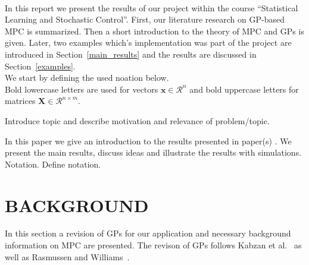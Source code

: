 \documentclass[letterpaper, 10 pt, conference]{ieeeconf}  %
\begin{document}
 \\
In this report we present the results of our project within the course ``Statistical Learning and Stochastic Control''. First, our literature research on GP-based MPC is summarized. Then a short introduction to the theory of MPC and GPs is given. Later, two examples which's  implementation was part of the project are introduced in Section~\ref{main_results} and the results are discussed in Section~\ref{examples}.\\
We start by defining the used noation below.\\
Bold lowercase letters are used for vectors $\boldsymbol{x} \in \mathcal{R}^n$ and bold uppercase letters for matrices $\boldsymbol{X} \in \mathcal{R}^{n \times m}$.

Introduce topic and describe motivation and relevance of problem/topic.

In this paper we give an introduction to the results presented in paper(s) \cite{Bro-14}.
We present the main results, discuss ideas and illustrate the results with simulations.\\

Notation. Define notation.

\section{BACKGROUND}
In this section a revision of GPs for our application and necessary background information on MPC are presented. The revison of GPs follows Kabzan et al.~\cite{kabzan2019learning} as well as Rasmussen and Williams~\cite{williams2006gaussian}. \\
\end{document}
